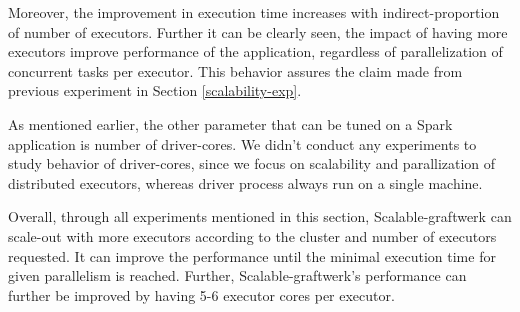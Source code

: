 Moreover, the improvement in execution time increases with indirect-proportion of number of executors. Further it can be clearly seen, the impact of having more executors improve performance of the application, regardless of parallelization of concurrent tasks per executor. This behavior assures the claim made from previous experiment in Section \ref{scalability-exp}. 

As mentioned earlier, the other parameter that can be tuned on a Spark application is number of driver-cores. We didn't conduct any experiments to study behavior of driver-cores, since we focus on scalability and parallization of distributed executors, whereas driver process always run on a single machine. 

Overall, through all experiments mentioned in this section, Scalable-graftwerk can scale-out with more executors according to the cluster and number of executors requested. It can improve the performance until the minimal execution time for given parallelism is reached. Further, Scalable-graftwerk's performance can further be improved by having 5-6 executor cores per executor.  


